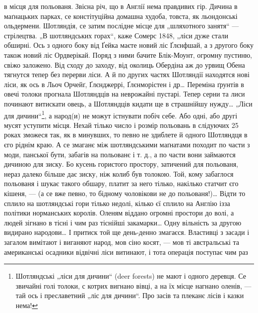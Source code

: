 \parcont{}
в місця для польованя. Звісна річ, що в Англії нема правдивих гір. Дичина в маґнацьких парках, се
констітуційна домашна худоба, товста, як льондонські ольдермени. Шотляндія, се затим послідне місце
для „шляхотного занятя“ — стрілецтва. „В шотляндських горах“, каже Сомерс 1848, „ліси дуже стали
обширні. Ось з одного боку від Ґейка маєте новий ліс Ґлєнфшай, а з другого боку також новий ліс
Ордверікай. Поряд з ними бачите Блік-Моунт, огромну пустиню, свіжо заложено. Від сходу до заходу,
від околиць Обердіна аж до урвищ Обена тягнутся тепер без перерви ліси. А й по других частях
Шотляндії находятся нові ліси, як ось в Льоч Орчейґ, Ґлєнджеррі, Ґлєнморістен і др\dots{} Переміна
ґрунтів в овечі толоки прогнала Шотляндців на неврожайні пустарі. Тепер серни та лиси починают
витискати овець, а Шотляндців кидати ще в страшнійшу нужду\dots{} „Ліси для дичини“\footnote{
Шотляндські „ліси для дичини“ (deer forests) не мают і одного деревця. Се звичайні голі толоки,
с котрих вигнано вівці, а на їх місце нагнано оленів, — тай ось і преславетний „ліс для дичини“. Про
засів та плеканє лісів і казки нема!
}, а народ(и) не
можут істнувати побіч себе. Або одні, або другі мусят уступити місця. Нехай тілько число і розмір
польовань в слідуючих 25 роках зможеся так, як в минувших, то певно не здиблете й одного Шотляндця в
єго ріднім краю. А се змаганє між шотляндськими маґнатами походит по части з моди, панської бути,
забагів на польованє і т. д., а по части вони займаются дичиною для зиску. Бо кусень гористого
простору, затичений для польованя, нераз далеко більше дає зиску, ніж колиб був толокою. Той, кому
забаглося польованя і шукає такого обшару, платит за него тілько, накілько статчит єго кішеня,
— (а се вже певно, то бідному чоловікови не до польованя!)\dots{} Відти то сплило на шотляндські гори
тілько недолі, кілько єї сплило на Англію ізза політики норманських
королів. Оленям віддано огромні простори до волі, а людей зігнано в тісні і чим раз тіснійші
закамарки\dots{} Одну вільність за другою видирано народови\dots{} І притиск той ще
день-денно змагаєся. Властивці з засади і загалом вимітают і виганяют народ, мов сіно косят, — мов
ті австральські та американські осадники відвічні ліси витинают, і тота операція поступає чим раз
